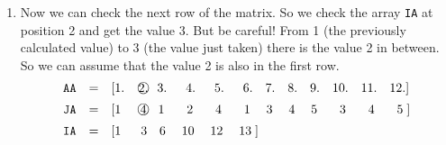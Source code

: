 \begin{itemize}
\begin{enumerate}
		\item Now we can check the next row of the matrix. So we check the array \texttt{IA} at position 2 and get the value 3. But be careful! From 1 (the previously calculated value) to 3 (the value just taken) there is the value 2 in between. So we can assume that the value 2 is also in the first row.
		\begin{equation*}
			\begin{array}{rcl}
				\texttt{AA} &=& \left[
				1.\hspace{1em}
				\circledtext{2.}\hspace{.6em}
				3.\hspace{1em}
				\phantom{1}4.\hspace{1em}
				\phantom{1}5.\hspace{1em}
				\phantom{1}6.\hspace{1em}
				7.\hspace{1em}
				8.\hspace{1em}
				9.\hspace{1em}
				10.\hspace{1em}
				11.\hspace{1em}
				12.
				\right] \\ [.5em]
				\texttt{JA} &=& \left[
				1\phantom{.}\hspace{1em}
				\circledtext{4}\phantom{.}\hspace{.4em}
				1\phantom{.}\hspace{1em}
				\phantom{1}2\phantom{.}\hspace{1em}
				\phantom{1}4\phantom{.}\hspace{1em}
				\phantom{1}1\phantom{.}\hspace{1em}
				3\phantom{.}\hspace{1em}
				4\phantom{.}\hspace{1em}
				5\phantom{.}\hspace{1em}
				\phantom{1}3\phantom{.}\hspace{1em}
				\phantom{1}4\phantom{.}\hspace{1em}
				\phantom{1}5\phantom{.}
				\right] \\ [.5em]
				\texttt{IA} &=& \left[
				1\phantom{.}\hspace{1.3em}
				3\phantom{.}\hspace{.7em}
				6\phantom{.}\hspace{1em}
				10\phantom{.}\hspace{1em}
				12\phantom{.}\hspace{1em}
				13\phantom{.}
				\right]

\end{array}
\end{equation*}
\end{enumerate}
\end{itemize}
